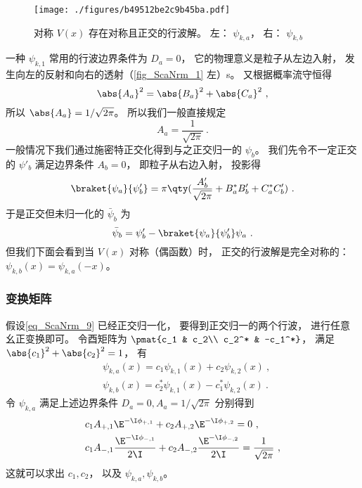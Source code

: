 \begin{figure}[ht]
\centering
\texttt{[image: ./figures/b49512be2c9b45ba.pdf]}
\caption{对称 $V(x)$ 存在对称且正交的行波解。 左： $\psi_{k,a}$， 右： $\psi_{k,b}$} \label{fig_ScaNrm_1}
\end{figure}

一种 $\psi_{k,1}$ 常用的行波边界条件为 $D_a = 0$， 它的物理意义是粒子从左边入射， 发生向左的反射和向右的透射（\autoref{fig_ScaNrm_1} 左）s。 又根据概率流守恒得
\begin{equation}
\abs{A_a}^2 = \abs{B_a}^2 + \abs{C_a}^2~,
\end{equation}
所以 $\abs{A_a} = 1/\sqrt{2\pi}$。 所以我们一般直接规定
\begin{equation}\label{eq_ScaNrm_10}
A_a = \frac{1}{\sqrt{2\pi}}~.
\end{equation}
一般情况下我们通过施密特正交化得到与之正交归一的 $\psi_b$。 我们先令不一定正交的 $\psi'_b$ 满足边界条件 $A_b = 0$， 即粒子从右边入射， 投影得
\begin{equation}
\braket{\psi_a}{\psi'_b} = \pi \qty(\frac{A'_b}{\sqrt{2\pi}} + B_a^* B'_b + C_a^*C'_b)~.
\end{equation}
于是正交但未归一化的 $\bar\psi_b$ 为
\begin{equation}
\bar\psi_b = \psi'_b - \braket{\psi_a}{\psi'_b}\psi_a~.
\end{equation}
但我们下面会看到当 $V(x)$ 对称（偶函数）时， 正交的行波解是完全对称的： $\psi_{k,b}(x) = \psi_{k,a}(-x)$。

\subsubsection{变换矩阵}
假设\autoref{eq_ScaNrm_9} 已经正交归一化， 要得到正交归一的两个行波， 进行任意幺正变换即可。 令酉矩阵为 $\pmat{c_1 & c_2\\ c_2^* & -c_1^*}$， 满足 $\abs{c_1}^2 + \abs{c_2}^2 = 1$， 有
\begin{equation}
\begin{aligned}
&\psi_{k,a}(x) = c_1\psi_{k,1}(x) + c_2\psi_{k,2}(x)~,\\
&\psi_{k,b}(x) = c_2^*\psi_{k,1}(x) - c_1^*\psi_{k,2}(x)~.
\end{aligned}
\end{equation}
令 $\psi_{k,a}$ 满足上述边界条件 $D_a = 0, A_a = 1/\sqrt{2\pi}$ 分别得到
\begin{equation}\label{eq_ScaNrm_12}
\begin{aligned}
&c_1 A_{+,1}\E^{-\I\phi_{+,1}} + c_2 A_{+,2}\E^{-\I\phi_{+,2}} = 0~,\\
&c_1 A_{-,1}\frac{\E^{-\I\phi_{-,1}}}{2\I} + c_2 A_{-,2}\frac{\E^{-\I\phi_{-,2}}}{2\I} = \frac{1}{\sqrt{2\pi}}~,
\end{aligned}
\end{equation}
这就可以求出 $c_1, c_2$， 以及 $\psi_{k,a}, \psi_{k,b}$。

